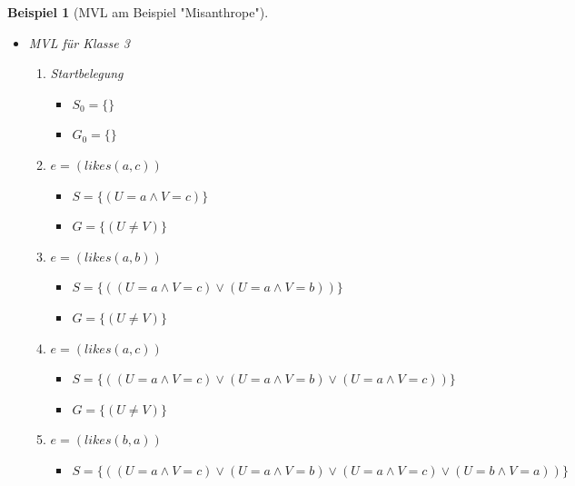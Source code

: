 \documentclass[a4paper, 11pt]{book}
\newtheorem{Bsp}{Beispiel}[section]
\begin{document}
\begin{Bsp}[MVL am Beispiel "{}Misanthrope"{}]
\begin{itemize}
\begin{enumerate}
\begin{itemize}
			\item $ G_0 = \{(U \neq V)\} $
		\end{itemize}
		\item $ e = (likes(c,b)) $
		\begin{itemize}
			\item $ S = \{(U = c \land V = b)\}$ 
			\item $ G = \{(U \neq V)\} $
		\end{itemize}
		\item $ e = (likes(b,c)) $
		\begin{itemize}
			\item \item $ S = \{()(U = c \land V = b) \lor (U = b \land V = c))\}$ 
			\item $ G = \{(U \neq V)\} $
		\end{itemize}
		\end{enumerate}
	\item MVL für Klasse 3
	\begin{enumerate}
		\item Startbelegung
		\begin{itemize}
			\item $ S_0 = \{\}$ 
			\item $ G_0 = \{\} $
		\end{itemize}
		\item $ e = (likes(a,c)) $
		\begin{itemize}
			\item $ S = \{(U = a \land V = c)\}$ 
			\item $ G = \{(U \neq V)\} $
		\end{itemize}
		\item $ e = (likes(a,b)) $
		\begin{itemize}
			\item $ S = \{((U = a \land V = c) \lor (U = a \land V = b))\}$ 
			\item $ G = \{(U \neq V)\} $
		\end{itemize}
		\item $ e = (likes(a,c)) $
		\begin{itemize}
			\item $ S = \{((U = a \land V = c) \lor (U = a \land V = b) \lor (U = a \land V = c))\}$ 
			\item $ G = \{(U \neq V)\} $
		\end{itemize}	
		\item $ e = (likes(b,a)) $
		\begin{itemize}
			\item $ S = \{((U = a \land V = c) \lor (U = a \land V = b) \lor (U = a \land V = c) \lor (U = b \land V = a))\}$ 

\end{itemize}
\end{enumerate}
\end{itemize}
\end{Bsp}
\end{document}
